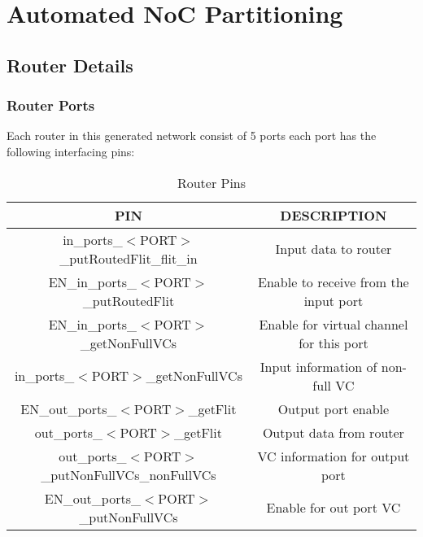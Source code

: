
\section{Automated NoC Partitioning}

\subsection{Router Details}
\begin{frame}
\frametitle{Router Ports}
Each router in this generated network consist of 5 ports each port has the following interfacing pins:
\begin{table}
\tiny
\caption{Router Pins}
 \begin{tabular}{||c | c||} 
 \hline
					  \textbf{PIN} & \textbf{DESCRIPTION} 				\\ \hline
	in\_ports\_$<$PORT$>$\_putRoutedFlit\_flit\_in & Input data to router				\\
	      EN\_in\_ports\_$<$PORT$>$\_putRoutedFlit & Enable to receive from the input port		\\
	      EN\_in\_ports\_$<$PORT$>$\_getNonFullVCs & Enable for virtual channel for this port	\\
		  in\_ports\_$<$PORT$>$\_getNonFullVCs & Input information of non-full VC 		\\
		   EN\_out\_ports\_$<$PORT$>$\_getFlit & Output port enable				\\
		       out\_ports\_$<$PORT$>$\_getFlit & Output data from router			\\
     out\_ports\_$<$PORT$>$\_putNonFullVCs\_nonFullVCs & VC information for output port			\\
	     EN\_out\_ports\_$<$PORT$>$\_putNonFullVCs & Enable for out port VC				\\
\hline
\end{tabular}
\end{table}   %
\end{frame}

